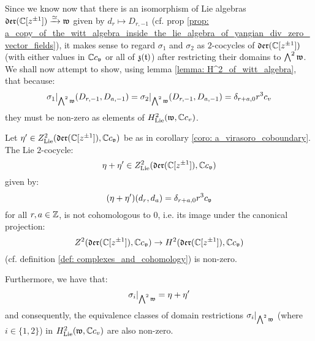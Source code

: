         Since we know now that there is an isomorphism of Lie algebras $\mathfrak{der}(\mathbb{C}[z^{\pm 1}]) \xrightarrow[]{\simeq} \mathfrak{w}$ given by $d_r \mapsto D_{r, -1}$ (cf. prop \ref{prop: a_copy_of_the_witt_algebra_inside_the_lie_algebra_of_yangian_div_zero_vector_fields}), it makes sense to regard $\sigma_1$ and $\sigma_2$ as $2$-cocycles of $\mathfrak{der}(\mathbb{C}[z^{\pm 1}])$ (with either values in $\mathbb{C} c_{\mathfrak{v}}$ or all of $\mathfrak{z}(\mathfrak{t})$) after restricting their domains to $\bigwedge^2 \mathfrak{w}$. We shall now attempt to show, using lemma \ref{lemma: H^2_of_witt_algebra}, that because:
            $$\sigma_1|_{\bigwedge^2 \mathfrak{w}}(D_{r, -1}, D_{a, -1}) = \sigma_2|_{\bigwedge^2 \mathfrak{w}}(D_{r, -1}, D_{a, -1}) = \delta_{r + a, 0} r^3 c_v$$
        they must be non-zero as elements of $H^2_{\mathrm{Lie}}(\mathfrak{w}, \mathbb{C} c_v)$.
        \begin{proposition} \label{prop: billig_toroidal_cocycles_on_the_witt_algebra}
            Let $\eta' \in Z^2_{\mathrm{Lie}}(\mathfrak{der}(\mathbb{C}[z^{\pm 1}]), \mathbb{C} c_{\mathfrak{v}})$ be as in corollary \ref{coro: a_virasoro_coboundary}. The Lie $2$-cocycle:
                $$\eta + \eta' \in Z^2_{\mathrm{Lie}}(\mathfrak{der}(\mathbb{C}[z^{\pm 1}]), \mathbb{C} c_{\mathfrak{v}})$$
            given by:
                $$(\eta + \eta')(d_r, d_a) = \delta_{r + a, 0} r^3 c_{\mathfrak{v}}$$
            for all $r, a \in \mathbb{Z}$, is not cohomologous to $0$, i.e. its image under the canonical projection:
                $$Z^2(\mathfrak{der}(\mathbb{C}[z^{\pm 1}]), \mathbb{C} c_{\mathfrak{v}}) \to H^2(\mathfrak{der}(\mathbb{C}[z^{\pm 1}]), \mathbb{C} c_{\mathfrak{v}})$$
            (cf. definition \ref{def: complexes_and_cohomology}) is non-zero.

            Furthermore, we have that:
                $$\sigma_i|_{\bigwedge^2 \mathfrak{w}} = \eta + \eta'$$
            and consequently, the equivalence classes of domain restrictions $\sigma_i|_{\bigwedge^2 \mathfrak{w}}$ (where $i \in \{1, 2\}$) in $H^2_{\mathrm{Lie}}( \mathfrak{w}, \mathbb{C} c_v )$ are also non-zero.
        \end{proposition}
